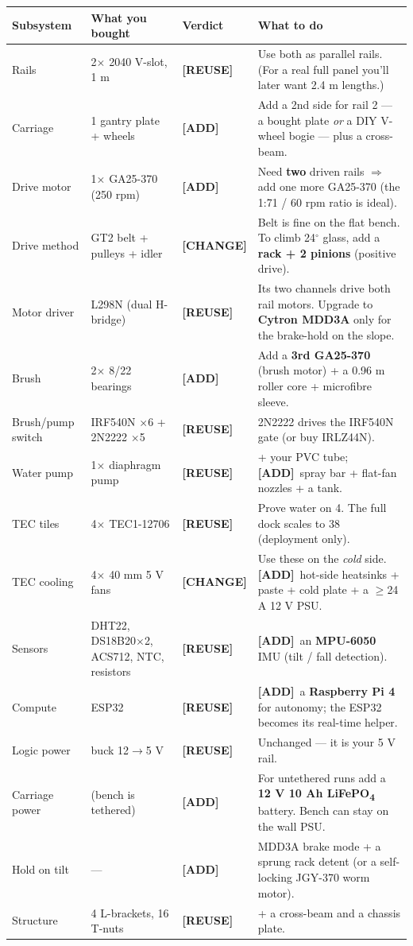 \documentclass[11pt,a4paper]{article}
\newcommand{\reuse}{\textcolor{green!50!black}{\textbf{[REUSE]}}}
\newcommand{\addp}{\textcolor{orange!85!black}{\textbf{[ADD]}}}
\newcommand{\change}{\textcolor{blue!70!black}{\textbf{[CHANGE]}}}
\begin{document}
\begin{center}\footnotesize
\begin{tabular}{@{}p{2.9cm}p{3.5cm}p{2.0cm}p{6.0cm}@{}}
\toprule
\textbf{Subsystem} & \textbf{What you bought} & \textbf{Verdict} & \textbf{What to do} \\
\midrule
Rails & 2$\times$ 2040 V-slot, 1 m & \reuse & Use both as parallel rails. (For a real full panel you'll later want 2.4 m lengths.) \\
Carriage & 1 gantry plate + wheels & \addp & Add a 2nd side for rail 2 --- a bought plate \emph{or} a DIY V-wheel bogie --- plus a cross-beam. \\
Drive motor & 1$\times$ GA25-370 (250 rpm) & \addp & Need \textbf{two} driven rails $\Rightarrow$ add one more GA25-370 (the 1:71 / 60 rpm ratio is ideal). \\
Drive method & GT2 belt + pulleys + idler & \change & Belt is fine on the flat bench. To climb 24$^\circ$ glass, add a \textbf{rack + 2 pinions} (positive drive). \\
Motor driver & L298N (dual H-bridge) & \reuse & Its two channels drive both rail motors. Upgrade to \textbf{Cytron MDD3A} only for the brake-hold on the slope. \\
Brush & 2$\times$ 8/22 bearings & \addp & Add a \textbf{3rd GA25-370} (brush motor) + a 0.96 m roller core + microfibre sleeve. \\
Brush/pump switch & IRF540N $\times$6 + 2N2222 $\times$5 & \reuse & 2N2222 drives the IRF540N gate (or buy IRLZ44N). \\
Water pump & 1$\times$ diaphragm pump & \reuse & + your PVC tube; \addp\ spray bar + flat-fan nozzles + a tank. \\
TEC tiles & 4$\times$ TEC1-12706 & \reuse & Prove water on 4. The full dock scales to 38 (deployment only). \\
TEC cooling & 4$\times$ 40 mm 5 V fans & \change & Use these on the \emph{cold} side. \addp\ hot-side heatsinks + paste + cold plate + a $\geq$24 A 12 V PSU. \\
Sensors & DHT22, DS18B20$\times$2, ACS712, NTC, resistors & \reuse & \addp\ an \textbf{MPU-6050} IMU (tilt / fall detection). \\
Compute & ESP32 & \reuse & \addp\ a \textbf{Raspberry Pi 4} for autonomy; the ESP32 becomes its real-time helper. \\
Logic power & buck 12$\to$5 V & \reuse & Unchanged --- it is your 5 V rail. \\
Carriage power & (bench is tethered) & \addp & For untethered runs add a \textbf{12 V 10 Ah LiFePO\textsubscript{4}} battery. Bench can stay on the wall PSU. \\
Hold on tilt & --- & \addp & MDD3A brake mode + a sprung rack detent (or a self-locking JGY-370 worm motor). \\
Structure & 4 L-brackets, 16 T-nuts & \reuse & + a cross-beam and a chassis plate. \\
\bottomrule
\end{tabular}
\end{center}
\end{document}
